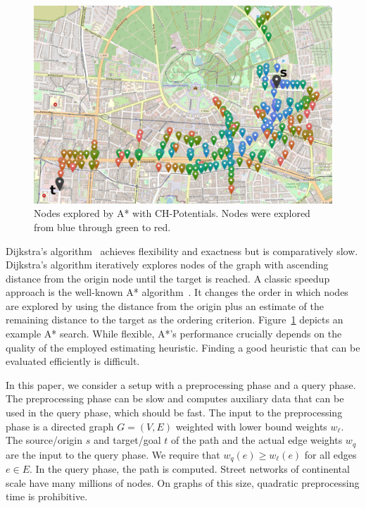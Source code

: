 \documentclass[letterpaper]{article} %
\begin{document}
\begin{figure}

\centering
\includegraphics[width=\columnwidth]{fig/searchspace_st.png}


\caption{Nodes explored by A* with CH-Potentials. Nodes were explored from blue through green to red.}
\label{img:search-space}
\end{figure}


Dijkstra's algorithm~\cite{d-ntpcg-59} achieves flexibility and exactness but is comparatively slow.
Dijkstra's algorithm iteratively explores nodes of the graph with ascending distance from the origin node until the target is reached.
A classic speedup approach is the well-known A* algorithm~\cite{hnr-afbhd-68}.
It changes the order in which nodes are explored by using the distance from the origin plus an estimate of the remaining distance to the target as the ordering criterion.
Figure~\ref{img:search-space} depicts an example A* search.
While flexible, A*'s performance crucially depends on the quality of the employed estimating heuristic.
Finding a good heuristic that can be evaluated efficiently is difficult.

In this paper, we consider a setup with a preprocessing phase and a query phase.
The preprocessing phase can be slow and computes auxiliary data that can be used in the query phase, which should be fast.
The input to the preprocessing phase is a directed graph $G=(V,E)$ weighted with lower bound weights $w_\ell$.
The source/origin $s$ and target/goal $t$ of the path and the actual edge weights $w_q$ are the input to the query phase.
We require that $w_q(e)\ge w_\ell(e)$ for all edges $e \in E$.
In the query phase, the path is computed.
%
Street networks of continental scale have many millions of nodes.
On graphs of this size, quadratic preprocessing time is prohibitive.
\end{document}
